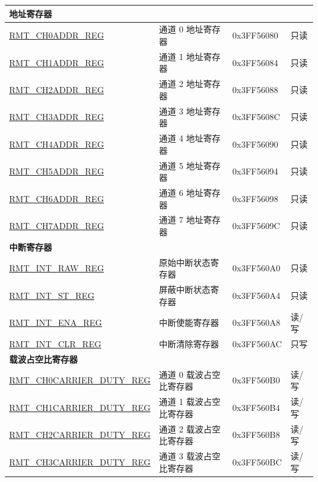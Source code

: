 \begin{longtable}{|p{5cm}|p{6.8cm} | p{2cm} | p{1.2cm} | }
\multicolumn{4}{|l|}{\textbf{地址寄存器}} \\ \hline
\hyperref[regdesc:RMTCHnADDRREG]{RMT\_CH0ADDR\_REG} & 通道 0 地址寄存器 & 0x3FF56080 & 只读 \\ \hline
\hyperref[regdesc:RMTCHnADDRREG]{RMT\_CH1ADDR\_REG} & 通道 1 地址寄存器 & 0x3FF56084 & 只读 \\ \hline
\hyperref[regdesc:RMTCHnADDRREG]{RMT\_CH2ADDR\_REG} & 通道 2 地址寄存器 & 0x3FF56088 & 只读 \\ \hline
\hyperref[regdesc:RMTCHnADDRREG]{RMT\_CH3ADDR\_REG} & 通道 3 地址寄存器 & 0x3FF5608C & 只读 \\ \hline
\hyperref[regdesc:RMTCHnADDRREG]{RMT\_CH4ADDR\_REG} & 通道 4 地址寄存器 & 0x3FF56090 & 只读 \\ \hline
\hyperref[regdesc:RMTCHnADDRREG]{RMT\_CH5ADDR\_REG} & 通道 5 地址寄存器 & 0x3FF56094 & 只读 \\ \hline
\hyperref[regdesc:RMTCHnADDRREG]{RMT\_CH6ADDR\_REG} & 通道 6 地址寄存器 & 0x3FF56098 & 只读 \\ \hline
\hyperref[regdesc:RMTCHnADDRREG]{RMT\_CH7ADDR\_REG} & 通道 7 地址寄存器 & 0x3FF5609C & 只读 \\ \hline
\multicolumn{4}{|l|}{\textbf{中断寄存器}} \\ \hline
\hyperref[regdesc:RMTINTRAWREG]{RMT\_INT\_RAW\_REG} & 原始中断状态寄存器 & 0x3FF560A0 & 只读 \\ \hline
\hyperref[regdesc:RMTINTSTREG]{RMT\_INT\_ST\_REG} & 屏蔽中断状态寄存器 & 0x3FF560A4 & 只读 \\ \hline
\hyperref[regdesc:RMTINTENAREG]{RMT\_INT\_ENA\_REG} & 中断使能寄存器 & 0x3FF560A8 & 读/写 \\ \hline
\hyperref[regdesc:RMTINTCLRREG]{RMT\_INT\_CLR\_REG} & 中断清除寄存器 & 0x3FF560AC & 只写 \\ \hline
\multicolumn{4}{|l|}{\textbf{载波占空比寄存器}} \\ \hline
\hyperref[regdesc:RMTCHnCARRIERDUTYREG]{RMT\_CH0CARRIER\_DUTY\_REG} & 通道 0 载波占空比寄存器 & 0x3FF560B0 & 读/写 \\ \hline
\hyperref[regdesc:RMTCHnCARRIERDUTYREG]{RMT\_CH1CARRIER\_DUTY\_REG} & 通道 1 载波占空比寄存器 & 0x3FF560B4 & 读/写 \\ \hline
\hyperref[regdesc:RMTCHnCARRIERDUTYREG]{RMT\_CH2CARRIER\_DUTY\_REG} & 通道 2 载波占空比寄存器 & 0x3FF560B8 & 读/写 \\ \hline
\hyperref[regdesc:RMTCHnCARRIERDUTYREG]{RMT\_CH3CARRIER\_DUTY\_REG} & 通道 3 载波占空比寄存器 & 0x3FF560BC & 读/写 \\ \hline

\end{longtable}
